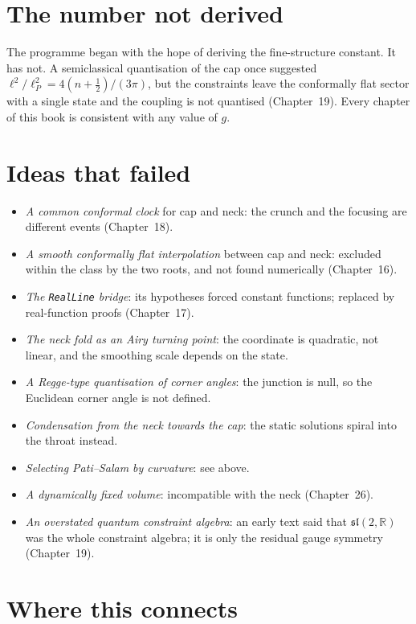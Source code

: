 \section{The number not derived}

The programme began with the hope of deriving the fine-structure constant. It has not. A semiclassical quantisation of the cap once suggested $\ell^2/\ell_P^2=4(n+\tfrac12)/(3\pi)$, but the constraints leave the conformally flat sector with a single state and the coupling is not quantised (Chapter~19). Every chapter of this book is consistent with any value of $g$.

\section{Ideas that failed}

\begin{itemize}[leftmargin=*]
\item \emph{A common conformal clock} for cap and neck: the crunch and the focusing are different events (Chapter~18).
\item \emph{A smooth conformally flat interpolation} between cap and neck: excluded within the class by the two roots, and not found numerically (Chapter~16).
\item \emph{The \texttt{RealLine} bridge}: its hypotheses forced constant functions; replaced by real-function proofs (Chapter~17).
\item \emph{The neck fold as an Airy turning point}: the coordinate is quadratic, not linear, and the smoothing scale depends on the state.
\item \emph{A Regge-type quantisation of corner angles}: the junction is null, so the Euclidean corner angle is not defined.
\item \emph{Condensation from the neck towards the cap}: the static solutions spiral into the throat instead.
\item \emph{Selecting Pati--Salam by curvature}: see above.
\item \emph{A dynamically fixed volume}: incompatible with the neck (Chapter~26).
\item \emph{An overstated quantum constraint algebra}: an early text said that $\mathfrak{sl}(2,\mathbb R)$ was the whole constraint algebra; it is only the residual gauge symmetry (Chapter~19).
\end{itemize}

\section{Where this connects}

